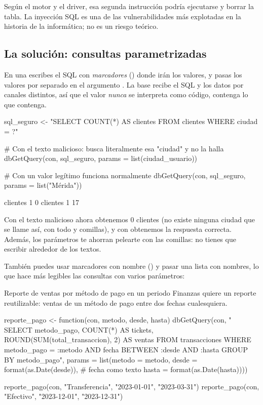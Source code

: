 Según el motor y el driver, esa segunda instrucción podría ejecutarse y
borrar la tabla. La inyección SQL es una de las vulnerabilidades más
explotadas en la historia de la informática; no es un riesgo teórico.

\subsection{La solución: consultas parametrizadas}

En una  escribes el SQL con
\emph{marcadores} () donde irán los valores, y pasas los valores
por separado en el argumento . La base recibe el SQL y los
datos por canales distintos, así que el valor \emph{nunca} se interpreta
como código, contenga lo que contenga.

\begin{rcode}
sql_seguro <- "SELECT COUNT(*) AS clientes FROM clientes WHERE ciudad = ?"

# Con el texto malicioso: busca literalmente esa "ciudad" y no la halla
dbGetQuery(con, sql_seguro, params = list(ciudad_usuario))

# Con un valor legítimo funciona normalmente
dbGetQuery(con, sql_seguro, params = list("Mérida"))
\end{rcode}

\begin{rsalida}
  clientes
1        0
  clientes
1       17
\end{rsalida}

Con el texto malicioso ahora obtenemos 0 clientes (no existe ninguna ciudad
que se llame así, con todo y comillas), y con  obtenemos
la respuesta correcta. Además, los parámetros te ahorran pelearte con las
comillas: no tienes que escribir  alrededor de los textos.

También puedes usar marcadores con nombre () y pasar una
lista con nombres, lo que hace más legibles las consultas con varios
parámetros:

\begin{ejemplo}{Reporte de ventas por método de pago en un periodo}
Finanzas quiere un reporte reutilizable: ventas de un método de pago entre
dos fechas cualesquiera.
\end{ejemplo}

\begin{rcode}
reporte_pago <- function(con, metodo, desde, hasta) {
  dbGetQuery(con, "
    SELECT metodo_pago,
           COUNT(*)                         AS tickets,
           ROUND(SUM(total_transaccion), 2) AS ventas
    FROM transacciones
    WHERE metodo_pago = :metodo
      AND fecha BETWEEN :desde AND :hasta
    GROUP BY metodo_pago",
    params = list(metodo = metodo,
                  desde  = format(as.Date(desde)),   # fecha como texto
                  hasta  = format(as.Date(hasta))))
}

reporte_pago(con, "Transferencia", "2023-01-01", "2023-03-31")
reporte_pago(con, "Efectivo", "2023-12-01", "2023-12-31")
\end{rcode}

